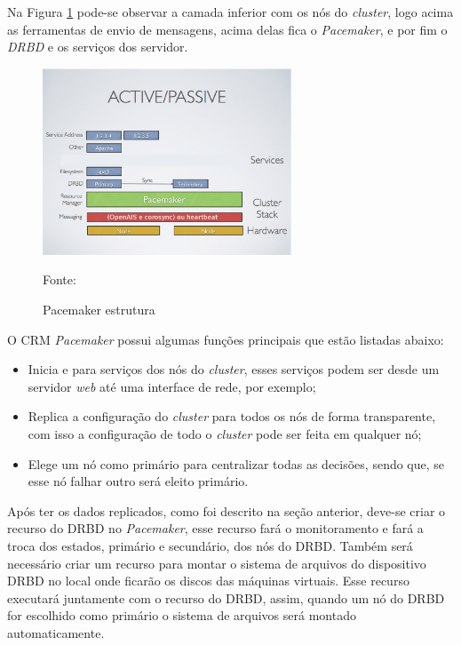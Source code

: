 \newpage
Na Figura \ref{fig:pacemaker_tools} pode-se observar a camada inferior com os nós do \textit{cluster}, logo acima as ferramentas de envio de 
mensagens, acima delas fica o \textit{Pacemaker}, e por fim o \textit{DRBD} e os serviços dos servidor.

\begin{figure}[h!]
 \centering
 \includegraphics[width=280px]{img/pacemaker_tools.eps}
 \caption{Pacemaker estrutura}
 Fonte: \citet{pacemaker}
 \label{fig:pacemaker_tools}
\end{figure}


O \ac{CRM} \textit{Pacemaker} possui algumas funções principais que estão listadas abaixo:
\begin{itemize}
 \item Inicia e para serviços dos nós do \textit{cluster}, esses serviços podem ser desde um servidor \textit{web} até uma interface de rede, 
 por exemplo;
 \item Replica a configuração do \textit{cluster} para todos os nós de forma transparente, com isso a configuração de todo o \textit{cluster} 
 pode ser feita em qualquer nó;
 \item Elege um nó como primário para centralizar todas as decisões, sendo que, se esse nó falhar outro será eleito primário.
\end{itemize}

Após ter os dados replicados, como foi descrito na seção anterior, deve-se criar o recurso do \ac{DRBD} no \textit{Pacemaker}, esse recurso fará o
monitoramento e fará a troca dos estados, primário e secundário, dos nós do \ac{DRBD}.
Também será necessário criar um recurso para montar o sistema de arquivos do dispositivo \ac{DRBD} no local onde ficarão os discos das máquinas
virtuais. Esse recurso executará juntamente com o recurso do \ac{DRBD}, assim, quando um nó do \ac{DRBD} for escolhido como primário o sistema de
arquivos será montado automaticamente.

